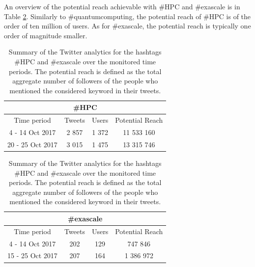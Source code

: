 An overview of the potential reach achievable with \#HPC and \#exascale is in Table \ref{Summary_HPC-Exascale}. Similarly to \#quantumcomputing, the potential reach of \#HPC is of the order of ten million of users. As for \#exascale, the potential reach is typically one order of magnitude smaller.

\begin{table}[t]
 \begin{center}
 
  \begin{tabular}{cccc}
   \hline 
   \hline
   \multicolumn{4}{c}{\#HPC}\\
   \hline
   \hline
   Time period & Tweets & Users & Potential Reach \\ 
   \hline
   4 - 14 Oct 2017 & 2 857 & 1 372 & 11 533 160  \\
   20 - 25 Oct 2017 & 3 015 & 1 475 & 13 315 746  \\
   \hline
   \hline
  \end{tabular}

  \bigskip

  \begin{tabular}{cccc}
   \hline 
   \hline
   \multicolumn{4}{c}{\#exascale}\\
   \hline 
   \hline
   Time period & Tweets & Users & Potential Reach \\ 
   \hline
   4 - 14 Oct 2017 & 202 & 129 & 747 846 \\
   15 - 25 Oct 2017 & 207 & 164 & 1 386 972  \\
   \hline
   \hline
  \end{tabular}
 \end{center} 
 \caption{Summary of the Twitter analytics for the hashtags \#HPC and \#exascale over the monitored time periods. The potential reach is defined as the total aggregate number of followers of the people who mentioned the considered keyword in their tweets.}
\label{Summary_HPC-Exascale} 
\end{table}    


